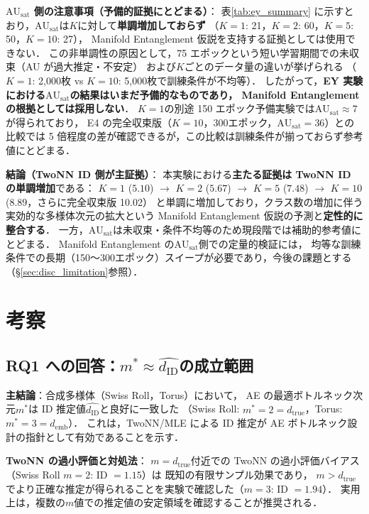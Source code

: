 \documentclass[12pt,a4paper]{jsarticle}
\newcommand{\dID}{d_{\mathrm{ID}}}
\newcommand{\dzopt}{m^*}                    %
\newcommand{\dtrue}{d_{\mathrm{true}}}
\newcommand{\AUsat}{\mathrm{AU}_{\mathrm{sat}}}
\newcommand{\demb}{d_{\mathrm{emb}}}
\begin{document}
\textbf{$\AUsat$ 側の注意事項（予備的証拠にとどまる）}：
表\ref{tab:ey_summary} に示すとおり，$\AUsat$は$K$に対して\textbf{単調増加しておらず}
（$K=1$: 21，$K=2$: 60，$K=5$: 50，$K=10$: 27），
Manifold Entanglement 仮説を支持する証拠としては使用できない．
この非単調性の原因として，75 エポックという短い学習期間での未収束（AU が過大推定・不安定）
および$K$ごとのデータ量の違いが挙げられる
（$K=1$: 2,000枚 vs $K=10$: 5,000枚で訓練条件が不均等）．
したがって，\textbf{EY 実験における$\AUsat$の結果はいまだ予備的なものであり，
Manifold Entanglement の根拠としては採用しない}．
$K = 1$の別途 150 エポック予備実験では$\AUsat \approx 7$が得られており，
E4 の完全収束版（$K=10$，300エポック，$\AUsat = 36$）との比較では
5 倍程度の差が確認できるが，この比較は訓練条件が揃っておらず参考値にとどまる．

\textbf{結論（TwoNN ID 側が主証拠）}：
本実験における\textbf{主たる証拠は TwoNN ID の単調増加}である：
$K = 1$ ($5.10$) $\to$ $K = 2$ ($5.67$) $\to$ $K = 5$ ($7.48$) $\to$ $K = 10$ ($8.89$，さらに完全収束版 10.02）
と単調に増加しており，クラス数の増加に伴う実効的な多様体次元の拡大という
Manifold Entanglement 仮説の予測と\textbf{定性的に整合する}．
一方，$\AUsat$は未収束・条件不均等のため現段階では補助的参考値にとどまる．
Manifold Entanglement の$\AUsat$側での定量的検証には，
均等な訓練条件での長期（150〜300エポック）スイープが必要であり，今後の課題とする
（§\ref{sec:disc_limitation}参照）．

\section{考察}\label{sec:discussion}

\subsection{RQ1 への回答：$\dzopt \approx \hat{\dID}$の成立範囲}\label{sec:disc_rq1}

\textbf{主結論}：合成多様体（Swiss Roll，Torus）において，
AE の最適ボトルネック次元$\dzopt$は ID 推定値$\hat{\dID}$と良好に一致した
（Swiss Roll: $\dzopt = 2 = \dtrue$，Torus: $\dzopt = 3 = \demb$）．
これは，TwoNN/MLE による ID 推定が AE ボトルネック設計の指針として有効であることを示す．

\textbf{TwoNN の過小評価と対処法}：
$m = \dtrue$付近での TwoNN の過小評価バイアス（Swiss Roll $m=2$: ID $= 1.15$）は
既知の有限サンプル効果\cite{facco2017twonn}であり，
$m > \dtrue$でより正確な推定が得られることを実験で確認した（$m=3$: ID $= 1.94$）．
実用上は，複数の$m$値での推定値の安定領域を確認することが推奨される．
\end{document}
